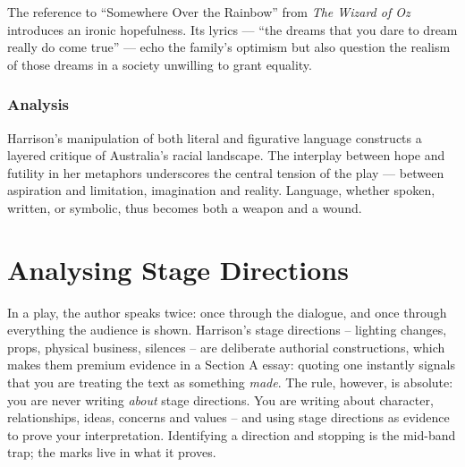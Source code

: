 \documentclass[a4paper]{article}
\begin{document}
The reference to “Somewhere Over the Rainbow” from \textit{The Wizard of Oz} introduces an ironic hopefulness. Its lyrics — “the dreams that you dare to dream really do come true” — echo the family’s optimism but also question the realism of those dreams in a society unwilling to grant equality.\\

\subsubsection{Analysis}
Harrison’s manipulation of both literal and figurative language constructs a layered critique of Australia’s racial landscape. The interplay between hope and futility in her metaphors underscores the central tension of the play — between aspiration and limitation, imagination and reality. Language, whether spoken, written, or symbolic, thus becomes both a weapon and a wound.\\




\newpage

\section{Analysing Stage Directions}

In a play, the author speaks twice: once through the dialogue, and once through everything the audience is shown. Harrison's stage directions -- lighting changes, props, physical business, silences -- are deliberate authorial constructions, which makes them premium evidence in a Section A essay: quoting one instantly signals that you are treating the text as something \textit{made}. The rule, however, is absolute: you are never writing \textit{about} stage directions. You are writing about character, relationships, ideas, concerns and values -- and using stage directions as evidence to prove your interpretation. Identifying a direction and stopping is the mid-band trap; the marks live in what it proves.\\
\end{document}
